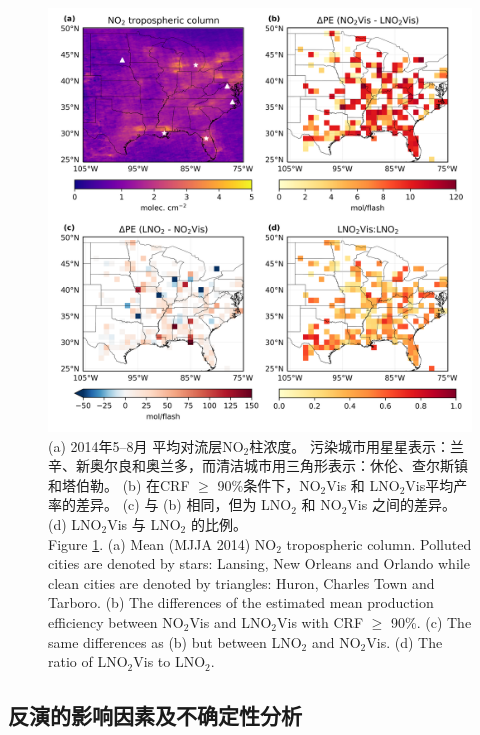 \begin{figure}[t]
\centering
\includegraphics[width=13cm]{./figures/us_delta.png}
\caption{(a) 2014年5--8月  平均对流层NO$_\textrm{2}$柱浓度。
污染城市用星星表示：兰辛、新奥尔良和奥兰多，而清洁城市用三角形表示：休伦、查尔斯镇和塔伯勒。
(b) 在CRF $\geq$ 90\%条件下，NO$_\textrm{2}$Vis 和 LNO$_\textrm{2}$Vis平均产率的差异。
(c) 与 (b) 相同，但为 LNO$_\textrm{2}$ 和 NO$_\textrm{2}$Vis 之间的差异。
(d) LNO$_\textrm{2}$Vis 与 LNO$_\textrm{2}$ 的比例。\\
Figure \ref{fig:us_delta}.
(a) Mean (MJJA 2014) NO$_\textrm{2}$ tropospheric column.
Polluted cities are denoted by stars: Lansing, New Orleans and Orlando while clean cities are denoted by triangles: Huron, Charles Town and Tarboro.
(b) The differences of the estimated mean production efficiency between NO$_\textrm{2}$Vis and LNO$_\textrm{2}$Vis with CRF $\geq$ 90\%.
(c) The same differences as (b) but between LNO$_\textrm{2}$ and NO$_\textrm{2}$Vis.
(d) The ratio of LNO$_\textrm{2}$Vis to LNO$_\textrm{2}$.
}
\label{fig:us_delta}
\end{figure}

\subsection{反演的影响因素及不确定性分析} \label{sec:uncertainty}

